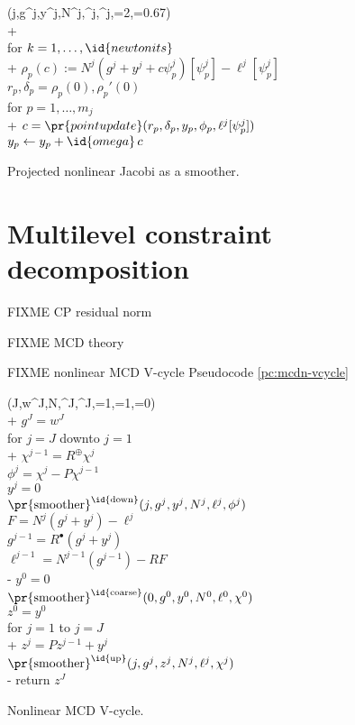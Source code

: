 \documentclass[letterpaper,final,12pt,reqno]{amsart}
\theoremstyle{claim}
\newcommand{\mR}{R^{\bm{\oplus}}}
\newcommand{\iR}{R^{\bullet}}
\numberwithin{equation}{section}
\numberwithin{figure}{section}
\numberwithin{table}{section}
\numberwithin{theorem}{section}
\begin{document}
\begin{pcode}[ht]
\begin{pseudo*}
(j,g^j,y^j,N^j,\ell^j,\phi^j,=2,=0.67)\text{:} \\+
     \\
    for $k=1,\dots,\id{newtonits}$ \\+
        $\rho_p(c) := N^j(g^j+y^j+c\psi_p^j)[\psi_p^j] - \ell^j[\psi_p^j]$ \\
        $r_p, \delta_p = \rho_p(0), \rho_p'(0)$ \qquad\qquad\qquad\qquad {}\\
        for $p=1,\dots,m_j$ \\+
            $c = \pr{pointupdate}(r_p, \delta_p,y_p,\phi_p,\ell^j[\psi_p^j])$ \\
            $y_p \gets y_p + \id{omega}\,c$
\end{pseudo*}
\caption{Projected nonlinear Jacobi as a smoother.}
\label{pc:pnj}
\end{pcode}


\section{Multilevel constraint decomposition} \label{sec:mcdstokes}

FIXME CP residual norm

FIXME MCD theory

FIXME nonlinear MCD V-cycle Pseudocode \ref{pc:mcdn-vcycle}

\begin{pcode}[ht]
\begin{pseudo*}
(J,w^J,N,\ell^J,\chi^J,=1,=1,=0)\text{:} \\+
    $g^J = w^J$ \\
    for $j=J$ downto $j=1$ \\+
      $\chi^{j-1} = \mR \chi^j$ \\
      $\phi^j = \chi^j - P\chi^{j-1}$ \\
      $y^j = 0$ \\
      $\text{\pr{smoother}}^{\text{\id{down}}}(j,g^j,y^j,N^j,\ell^j,\phi^j)$ \qquad {} \\
      $F = N^j(g^j+y^j) - \ell^j$ \\
      $g^{j-1} = \iR(g^j + y^j)$ \\
      $\ell^{j-1} = N^{j-1}(g^{j-1}) - R F$ \\-
    $y^0 = 0$ \\
    $\text{\pr{smoother}}^{\text{\id{coarse}}}(0,g^0,y^0,N^0,\ell^0,\chi^0)$ \\
    $z^0 = y^0$ \\
    for $j=1$ to $j=J$ \\+
      $z^j = P z^{j-1} + y^{j}$ \\
      $\text{\pr{smoother}}^{\text{\id{up}}}(j,g^j,z^j,N^j,\ell^j,\chi^j)$ \qquad {} \\-
    return $z^J$
\end{pseudo*}
\caption{Nonlinear MCD V-cycle.}
\label{pc:mcdn-vcycle}
\end{pcode}
\end{document}
